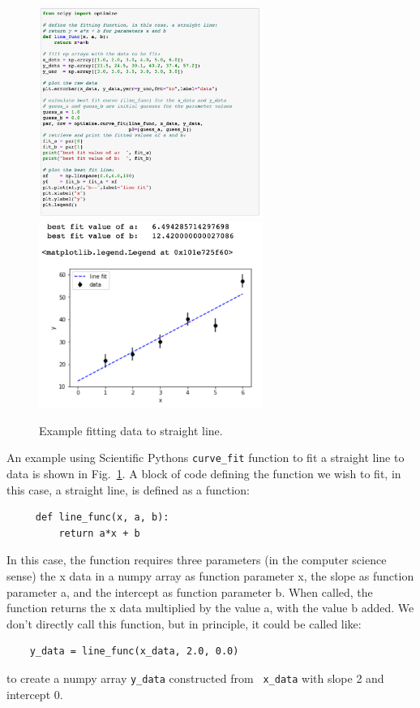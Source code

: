 \begin{figure}[htbp]
\begin{center}
\includegraphics[width=0.65\textwidth]{figs/fitting/fit_code.png} \\
\includegraphics[width=0.65\textwidth]{figs/fitting/fit_out.png} \\
\caption{Example fitting data to straight line.}
\label{fig:fiteg}
\end{center}
\end{figure}

An example using Scientific Pythons {\tt curve{\_}fit} function to fit
a straight line to data is shown in Fig.~\ref{fig:fiteg}.  A block of 
code defining the function we wish to fit, in this case, a straight
line, is defined as a function:
\begin{verbatim}
     def line_func(x, a, b):
         return a*x + b
\end{verbatim}
In this case, the function requires three parameters (in the computer
science sense) the x data in a numpy array as function parameter x,
the slope as function parameter a, and the intercept as function
parameter b.  When called, the function returns the x data multiplied
by the value a, with the value b added.  We don't directly call this
function, but in principle, it could be called like:
\begin{verbatim}
    y_data = line_func(x_data, 2.0, 0.0)
\end{verbatim}
to create a numpy array {\tt y{\_}data} constructed from {\tt
  x{\_}data} with slope 2 and intercept 0.

